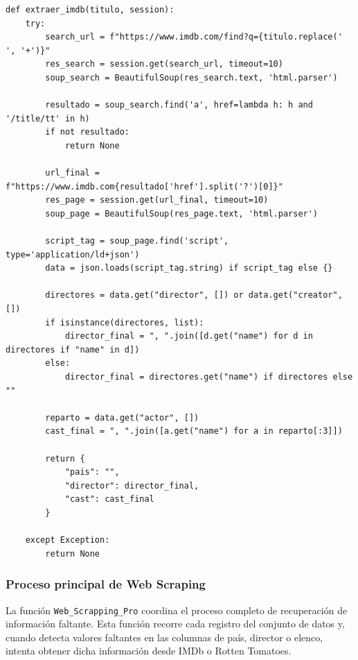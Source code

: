 \documentclass[12pt]{article}
\begin{document}
\begin{lstlisting}
def extraer_imdb(titulo, session):
    try:
        search_url = f"https://www.imdb.com/find?q={titulo.replace(' ', '+')}"
        res_search = session.get(search_url, timeout=10)
        soup_search = BeautifulSoup(res_search.text, 'html.parser')

        resultado = soup_search.find('a', href=lambda h: h and '/title/tt' in h)
        if not resultado:
            return None

        url_final = f"https://www.imdb.com{resultado['href'].split('?')[0]}"
        res_page = session.get(url_final, timeout=10)
        soup_page = BeautifulSoup(res_page.text, 'html.parser')

        script_tag = soup_page.find('script', type='application/ld+json')
        data = json.loads(script_tag.string) if script_tag else {}

        directores = data.get("director", []) or data.get("creator", [])
        if isinstance(directores, list):
            director_final = ", ".join([d.get("name") for d in directores if "name" in d])
        else:
            director_final = directores.get("name") if directores else ""

        reparto = data.get("actor", [])
        cast_final = ", ".join([a.get("name") for a in reparto[:3]])

        return {
            "pais": "",
            "director": director_final,
            "cast": cast_final
        }

    except Exception:
        return None
\end{lstlisting}
\vspace{2cm}
\subsubsection{Proceso principal de Web Scraping}

La función \texttt{Web\_Scrapping\_Pro} coordina el proceso completo de recuperación de
información faltante. Esta función recorre cada registro del conjunto de datos y, cuando
detecta valores faltantes en las columnas de país, director o elenco, intenta obtener
dicha información desde IMDb o Rotten Tomatoes.
\end{document}
